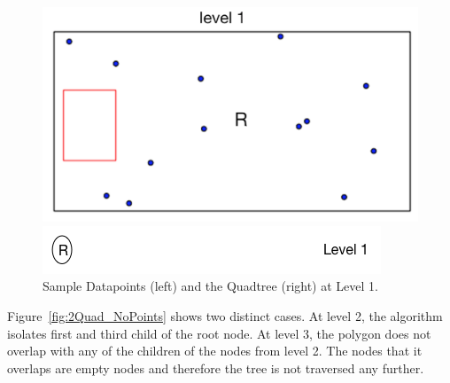 \begin{figure}[ht]
  \centering
  \vspace{0.5in}
  \begin{minipage}[b]{0.35\textwidth}
    \includegraphics[width=\textwidth]{Images/NoPointQuad1}
  \end{minipage}
  \hfill
  \begin{minipage}[b]{0.6\textwidth}
    \includegraphics[width=\textwidth]{Images/1_1Quad_1_tree}
  \end{minipage}
  \vspace{0.5in}
  \caption{Sample Datapoints (left) and the Quadtree (right) at Level 1.}
  \label{fig:1Quad_NoPoints}
\end{figure}

Figure~\ref{fig:2Quad_NoPoints} shows two distinct cases. At level 2, the algorithm isolates first and third child of the root node.
At level 3, the polygon does not overlap with any of the children of the nodes from level 2. The nodes that it overlaps are empty nodes and therefore the tree is not traversed any further.

